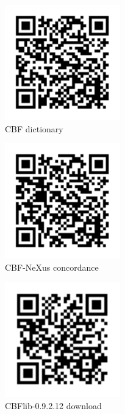 \documentclass[11pt]{a0poster}
\begin{document}
\begin{minipage}[]{0.29\linewidth}
\vspace{-5mm}
\begin{minipage}[]{0.29\linewidth}
\begin{center}
\includegraphics[width=50mm]{cbfdic_qr}
{~~\\
CBF dictionary}
\end{center}
\end{minipage}\hfill%
\begin{minipage}[]{0.29\linewidth}
\begin{center}
\includegraphics[width=50mm]{mappingdraft_qr}
{~~\\
CBF-NeXus concordance}
\end{center}
\end{minipage}\hfill%
\begin{minipage}[]{0.29\linewidth}
\begin{center}
\includegraphics[width=50mm]{cbflibdownload_qr}
{~~\\
CBFlib-0.9.2.12 download}
\end{center}
\end{minipage}


\end{minipage}%
\end{document}
